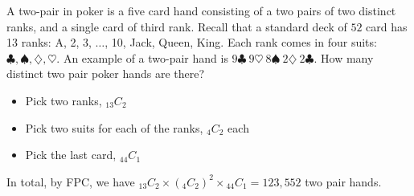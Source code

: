 \begin{example}
    A two-pair in poker is a five card hand consisting of a two pairs of two distinct ranks, and a single card of third rank. Recall that a standard deck of $52$ card has 13 ranks: A, 2, 3, $\dots$, 10, Jack, Queen, King. Each rank comes in four suits: $\clubsuit, \spadesuit, \diamondsuit, \heartsuit$. An example of a two-pair hand is $9 \clubsuit ~ 9 \heartsuit ~ 8 \spadesuit ~ 2 \diamondsuit ~ 2 \clubsuit$. How many distinct two pair poker hands are there? 

    \begin{itemize}
        \item Pick two ranks, ${}_{13}C_2$
        \item Pick two suits for each of the ranks, ${}_4C_2$ each
        \item Pick the last card, ${}_{44}C_1$
    \end{itemize}

    In total, by FPC, we have ${}_{13}C_2 \times \left( {}_4C_2 \right)^2 \times {}_{44}C_1 = 123,552$ two pair hands. 
\end{example}

